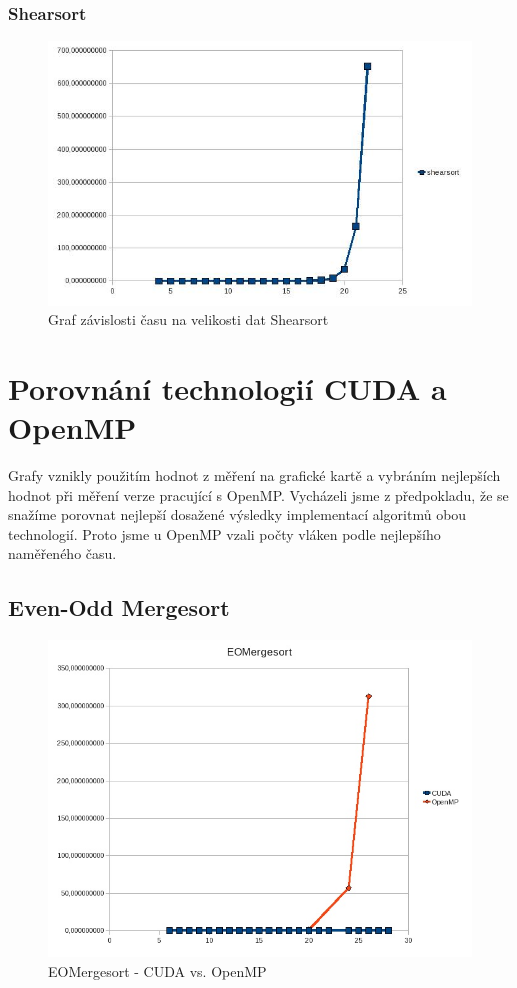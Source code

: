 \documentclass[12pt]{article}
\begin{document}
\subsubsection{Shearsort}
\begin{figure}[H]
\begin{center}
\includegraphics[width=14cm]{cuda-shearsort.jpg}
\caption{Graf závislosti času na velikosti dat Shearsort}
\label{fig:cuda-shearsort}
\end{center}
\end{figure}

\section{Porovnání technologií CUDA a OpenMP}
Grafy vznikly použitím hodnot z měření na grafické kartě a vybráním nejlepších hodnot při měření verze pracující s OpenMP.
Vycházeli jsme z předpokladu, že se snažíme porovnat nejlepší dosažené výsledky implementací algoritmů obou technologií. Proto jsme
u OpenMP vzali počty vláken podle nejlepšího naměřeného času.
\subsection{Even-Odd Mergesort}
\begin{figure}[H]
\begin{center}
\includegraphics[width=14cm]{eom-cudavsomp.jpg}
\caption{EOMergesort - CUDA vs. OpenMP}
\label{fig:eom-cuda-vs-omp}
\end{center}
\end{figure}
\end{document}
